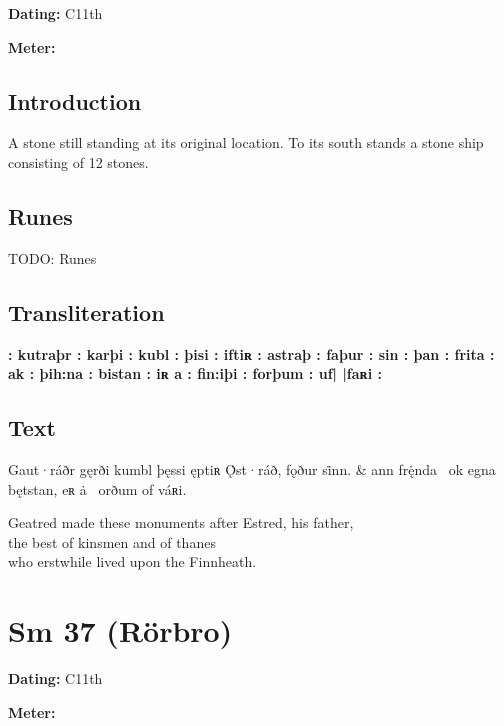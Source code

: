 \begin{flushright}%
\textbf{Dating:} C11th

\textbf{Meter:} \Fornyrdislag
\end{flushright}%

\subsection{Introduction}

A stone still standing at its original location.  To its south stands a stone ship consisting of 12 stones.

\subsection{Runes}

TODO: Runes%

\subsection{Transliteration}

\textbf{: kutraþr : karþi : kubl : þisi : iftiʀ : astraþ : faþur : sin : þan : frita : ak : þih:na : bistan : iʀ a : fin:iþi : forþum : uf| |faʀi :}

\subsection{Text}

\bvg\bva[]%
Gaut·ráðr gęrði kumbl þęssi ęptiʀ Ǫ̇st·ráð, fǫður si̇nn. &
ann frę̇nda \hld\ ok egna bętstan,
eʀ ȧ  \hld\ orðum of váʀi.\eva

\bvb Geatred made these monuments after Estred, his father, \\
the best of kinsmen and of thanes \\
who erstwhile lived upon the Finnheath.\evb\evg

\sectionline\clearpage


\section{Sm 37 (Rörbro)}

\begin{flushright}%
\textbf{Dating:} C11th

\textbf{Meter:} \Fornyrdislag
\end{flushright}%

